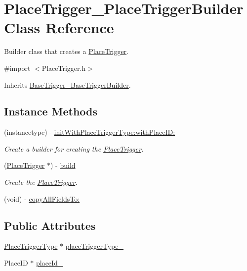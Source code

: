 \hypertarget{interface_place_trigger___place_trigger_builder}{}\section{Place\+Trigger\+\_\+\+Place\+Trigger\+Builder Class Reference}
\label{interface_place_trigger___place_trigger_builder}


Builder class that creates a \hyperlink{interface_place_trigger}{Place\+Trigger}.  




{\ttfamily \#import $<$Place\+Trigger.\+h$>$}



Inherits \hyperlink{interface_base_trigger___base_trigger_builder}{Base\+Trigger\+\_\+\+Base\+Trigger\+Builder}.

\subsection*{Instance Methods}
\begin{DoxyCompactItemize}
\item 
(instancetype) -\/ \hyperlink{interface_place_trigger___place_trigger_builder_aab7cdfa1c29cb08ae9f7db7796455815}{init\+With\+Place\+Trigger\+Type\+:with\+Place\+I\+D\+:}
\begin{DoxyCompactList}\small\item\em Create a builder for creating the \hyperlink{interface_place_trigger}{Place\+Trigger}. \end{DoxyCompactList}\item 
(\hyperlink{interface_place_trigger}{Place\+Trigger} $\ast$) -\/ \hyperlink{interface_place_trigger___place_trigger_builder_a17b1b33297247fdc8d43d31de6b17b09}{build}
\begin{DoxyCompactList}\small\item\em Create the \hyperlink{interface_place_trigger}{Place\+Trigger}. \end{DoxyCompactList}\item 
(void) -\/ \hyperlink{interface_place_trigger___place_trigger_builder_a929a5b5a5a993b40bbc1eec52460da97}{copy\+All\+Fields\+To\+:}
\end{DoxyCompactItemize}
\subsection*{Public Attributes}
\begin{DoxyCompactItemize}
\item 
\hyperlink{interface_place_trigger_type}{Place\+Trigger\+Type} $\ast$ \hyperlink{interface_place_trigger___place_trigger_builder_ad9a4e7257b8c8d111d7c903d87af6e11}{place\+Trigger\+Type\+\_\+}
\item 
Place\+I\+D $\ast$ \hyperlink{interface_place_trigger___place_trigger_builder_ad182131b179767343c9e1124bfdbca6b}{place\+Id\+\_\+}
\end{DoxyCompactItemize}


